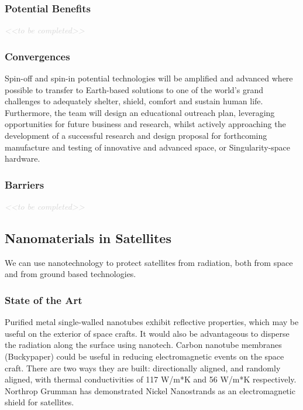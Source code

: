 \documentclass[letter,11pt]{article}
\newcommand{\todo}[1]{\textcolor{lightgray}{\textit{<<#1>>}}}
\newcommand{\tbc}{\begin{center} \todo{to be completed} \end{center}}
\newcommand{\tbcsubsubsection}[1]{ \refstepcounter{subsubsection}%
  \subsubsection*{\thesubsubsection \quad #1} \tbc}
\begin{document}
\subsubsection{Potential Benefits}
\tbc

\subsubsection{Convergences}

Spin-off and spin-in potential technologies will be amplified and advanced
where possible to transfer to Earth-based solutions to one of the world's grand
challenges to adequately shelter, shield, comfort and sustain human life.
Furthermore, the team will design an educational outreach plan, leveraging
opportunities for future business and research, whilst actively approaching the
development of a successful research and design proposal for forthcoming
manufacture and testing of innovative and advanced space, or Singularity-space
hardware. 

\tbcsubsubsection{Barriers}

\subsection{Nanomaterials in Satellites}

We can use nanotechnology to protect satellites from radiation, both from space and from ground based technologies.

\subsubsection{State of the Art}

Purified metal single-walled nanotubes exhibit reflective properties, which may be useful on the exterior of space crafts. It would also be advantageous to disperse the radiation along the surface using nanotech. Carbon nanotube membranes (Buckypaper) could be useful in reducing electromagnetic events on the space craft. There are two ways they are built: directionally aligned, and randomly aligned, with thermal conductivities of 117 W/m*K and 56 W/m*K respectively. Northrop Grumman has demonstrated Nickel Nanostrands as an electromagnetic shield for satellites.
\end{document}
